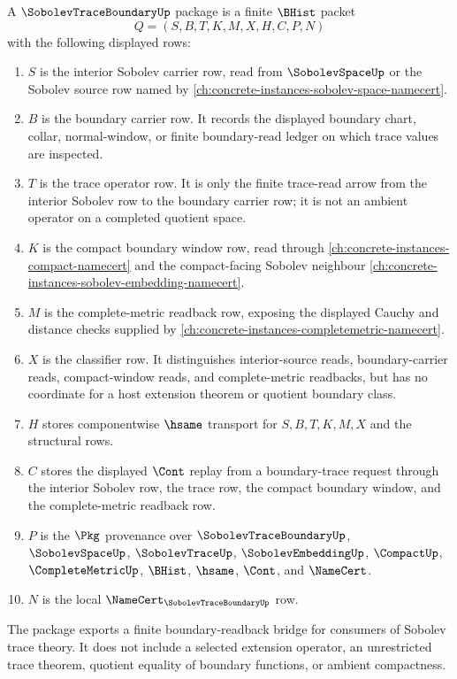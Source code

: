 \begin{definition}
\label{def:sobolev-trace-boundary-package}
A $\SobolevTraceBoundaryUp$ package is a finite $\BHist$ packet
$$
Q=(S,B,T,K,M,X,H,C,P,N)
$$
with the following displayed rows:
\begin{enumerate}
\item $S$ is the interior Sobolev carrier row, read from $\SobolevSpaceUp$ or the Sobolev source row named by \autoref{ch:concrete-instances-sobolev-space-namecert}.
\item $B$ is the boundary carrier row. It records the displayed boundary chart, collar, normal-window, or finite boundary-read ledger on which trace values are inspected.
\item $T$ is the trace operator row. It is only the finite trace-read arrow from the interior Sobolev row to the boundary carrier row; it is not an ambient operator on a completed quotient space.
\item $K$ is the compact boundary window row, read through \autoref{ch:concrete-instances-compact-namecert} and the compact-facing Sobolev neighbour \autoref{ch:concrete-instances-sobolev-embedding-namecert}.
\item $M$ is the complete-metric readback row, exposing the displayed Cauchy and distance checks supplied by \autoref{ch:concrete-instances-completemetric-namecert}.
\item $X$ is the classifier row. It distinguishes interior-source reads, boundary-carrier reads, compact-window reads, and complete-metric readbacks, but has no coordinate for a host extension theorem or quotient boundary class.
\item $H$ stores componentwise $\hsame$ transport for $S,B,T,K,M,X$ and the structural rows.
\item $C$ stores the displayed $\Cont$ replay from a boundary-trace request through the interior Sobolev row, the trace row, the compact boundary window, and the complete-metric readback row.
\item $P$ is the $\Pkg$ provenance over $\SobolevTraceBoundaryUp$, $\SobolevSpaceUp$, $\SobolevTraceUp$, $\SobolevEmbeddingUp$, $\CompactUp$, $\CompleteMetricUp$, $\BHist$, $\hsame$, $\Cont$, and $\NameCert$.
\item $N$ is the local $\NameCert_{\SobolevTraceBoundaryUp}$ row.
\end{enumerate}
The package exports a finite boundary-readback bridge for consumers of Sobolev trace theory. It does not include a selected extension operator, an unrestricted trace theorem, quotient equality of boundary functions, or ambient compactness.
\end{definition}


